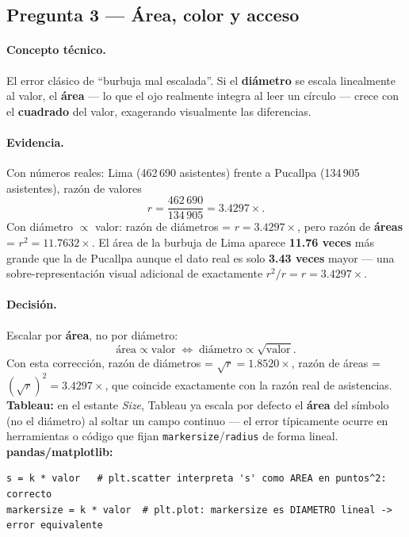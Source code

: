 \subsection{Pregunta 3 --- Área, color y acceso}
\label{ssec:c4-q3}

\paragraph{Concepto técnico.} El error clásico de ``burbuja mal escalada''. Si el \textbf{diámetro} se escala linealmente al valor, el \textbf{área} --- lo que el ojo realmente integra al leer un círculo \citep{cleveland1984graphical} --- crece con el \textbf{cuadrado} del valor, exagerando visualmente las diferencias.

\paragraph{Evidencia.} Con números reales: Lima (462\,690 asistentes) frente a Pucallpa (134\,905 asistentes), razón de valores
\[
r = \frac{462\,690}{134\,905} = 3.4297\times.
\]
Con diámetro $\propto$ valor: razón de diámetros = $r = 3.4297\times$, pero razón de \textbf{áreas} = $r^2 = 11.7632\times$. El área de la burbuja de Lima aparece \textbf{11.76 veces} más grande que la de Pucallpa aunque el dato real es solo \textbf{3.43 veces} mayor --- una sobre-representación visual adicional de exactamente $r^2/r = r = 3.4297\times$.

\paragraph{Decisión.} Escalar por \textbf{área}, no por diámetro:
\[
\text{área} \propto \text{valor} \;\Longleftrightarrow\; \text{diámetro} \propto \sqrt{\text{valor}}.
\]
Con esta corrección, razón de diámetros = $\sqrt{r} = 1.8520\times$, razón de áreas = $(\sqrt{r})^2 = 3.4297\times$, que coincide exactamente con la razón real de asistencias. \textbf{Tableau:} en el estante \emph{Size}, Tableau ya escala por defecto el \textbf{área} del símbolo (no el diámetro) al soltar un campo continuo --- el error típicamente ocurre en herramientas o código que fijan \texttt{markersize}/\texttt{radius} de forma lineal. \textbf{pandas/matplotlib:}
\begin{lstlisting}[style=cod]
s = k * valor   # plt.scatter interpreta 's' como AREA en puntos^2: correcto
markersize = k * valor  # plt.plot: markersize es DIAMETRO lineal -> error equivalente
\end{lstlisting}

